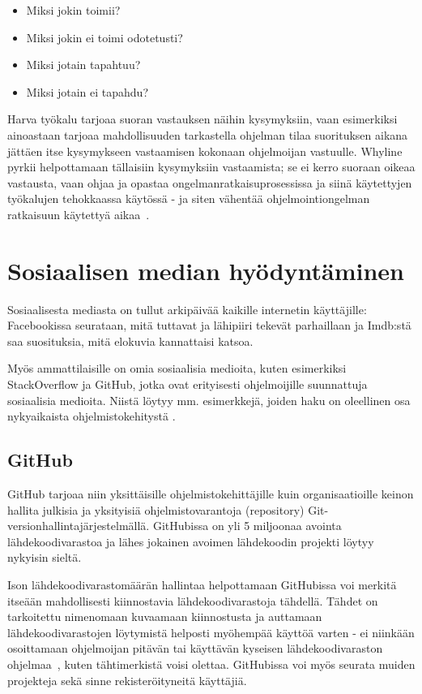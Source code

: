 \documentclass[finnish]{tktltiki2}
\theoremstyle{definition}
\theoremstyle{remark}
\begin{document}
\begin{itemize}
  \item Miksi jokin toimii?
  \item Miksi jokin ei toimi odotetusti?
  \item Miksi jotain tapahtuu?
  \item Miksi jotain ei tapahdu?
\end{itemize}

Harva työkalu tarjoaa suoran vastauksen näihin kysymyksiin, vaan esimerkiksi ainoastaan tarjoaa mahdollisuuden tarkastella ohjelman tilaa suorituksen aikana jättäen itse kysymykseen vastaamisen kokonaan ohjelmoijan vastuulle.
Whyline pyrkii helpottamaan tällaisiin kysymyksiin vastaamista; se ei kerro suoraan oikeaa vastausta, vaan ohjaa ja opastaa ongelmanratkaisuprosessissa ja siinä käytettyjen työkalujen tehokkaassa käytössä - ja siten vähentää ohjelmointiongelman ratkaisuun käytettyä aikaa~\cite{whyline}.

\section{Sosiaalisen median hyödyntäminen}
Sosiaalisesta mediasta on tullut arkipäivää kaikille internetin käyttäjille:  Facebookissa seurataan, mitä tuttavat ja lähipiiri tekevät parhaillaan ja Imdb:stä saa  suosituksia, mitä elokuvia kannattaisi katsoa.

Myös ammattilaisille on omia sosiaalisia medioita, kuten esimerkiksi StackOverflow ja GitHub, jotka ovat erityisesti ohjelmoijille suunnattuja sosiaalisia medioita. Niistä löytyy mm. esimerkkejä, joiden haku on oleellinen osa nykyaikaista ohjelmistokehitystä \cite{example-overflow-social-media-for-code-recommendations}.

\subsection{GitHub}
GitHub tarjoaa niin yksittäisille ohjelmistokehittäjille kuin organisaatioille keinon hallita julkisia ja yksityisiä ohjelmistovarantoja (repository) Git-versionhallintajärjestelmällä. GitHubissa on yli 5 miljoonaa avointa lähdekoodivarastoa ja lähes jokainen avoimen lähdekoodin projekti löytyy nykyisin sieltä.

Ison lähdekoodivarastomäärän hallintaa helpottamaan GitHubissa voi merkitä itseään mahdollisesti kiinnostavia lähdekoodivarastoja tähdellä. Tähdet on tarkoitettu nimenomaan kuvaamaan kiinnostusta ja auttamaan lähdekoodivarastojen löytymistä helposti myöhempää käyttöä varten - ei niinkään osoittamaan ohjelmoijan pitävän tai käyttävän kyseisen lähdekoodivaraston ohjelmaa~\cite{social-networking-meets-se}, kuten tähtimerkistä voisi olettaa. GitHubissa voi myös seurata muiden projekteja sekä sinne rekisteröityneitä käyttäjiä.
\end{document}
